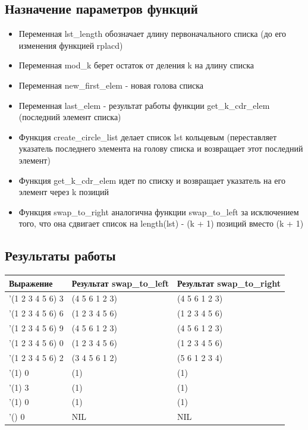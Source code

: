 \documentclass[a4paper,12pt]{article}
\begin{document}
	\newpage
	
	\subsection*{Назначение параметров функций}
	
	\begin{itemize}
		\item Переменная lst\_length обозначает длину первоначального списка (до его изменения функцией rplacd)
		\item Переменная mod\_k берет остаток от деления k на длину списка
		\item Переменная new\_first\_elem - новая голова списка
		\item Переменная last\_elem - результат работы функции get\_k\_cdr\_elem (последний элемент списка)
		\item Функция create\_circle\_list делает список lst кольцевым (переставляет указатель последнего элемента на голову списка и возвращает этот последний элемент)
		\item Функция get\_k\_cdr\_elem идет по списку и возвращает указатель на его элемент через k позиций
		\item Функция swap\_to\_right аналогична функции swap\_to\_left за исключением того, что она сдвигает список на length(lst) - (k + 1) позиций вместо (k + 1)
	\end{itemize}
	
	\subsection*{Результаты работы}
	
	\begin{table} [h!]
		\begin{center}
			\begin{tabular}{|l|l|l|}
				\hline
				{\bf  Выражение} &  {\bf Результат swap\_to\_left} &  {\bf Результат swap\_to\_right}\\
				\hline
				{'(1 2 3 4 5 6) 3} & (4 5 6 1 2 3) & (4 5 6 1 2 3)\\
				\hline
				{'(1 2 3 4 5 6) 6} & (1 2 3 4 5 6) & (1 2 3 4 5 6)\\
				\hline
				{'(1 2 3 4 5 6) 9} & (4 5 6 1 2 3) & (4 5 6 1 2 3)\\
				\hline
				{'(1 2 3 4 5 6) 0} & (1 2 3 4 5 6) & (1 2 3 4 5 6)\\
				\hline
				{'(1 2 3 4 5 6) 2} & (3 4 5 6 1 2) & (5 6 1 2 3 4)\\
				\hline
				{'(1) 0} & (1) & (1)\\
				\hline
				{'(1) 3} & (1) & (1)\\
				\hline
				{'(1) 0} & (1) & (1)\\
				\hline
				{'() 0} & NIL & NIL\\
				\hline
			\end{tabular}  
			\label{m4}
		\end{center}
	\end{table}
	
\end{document}
